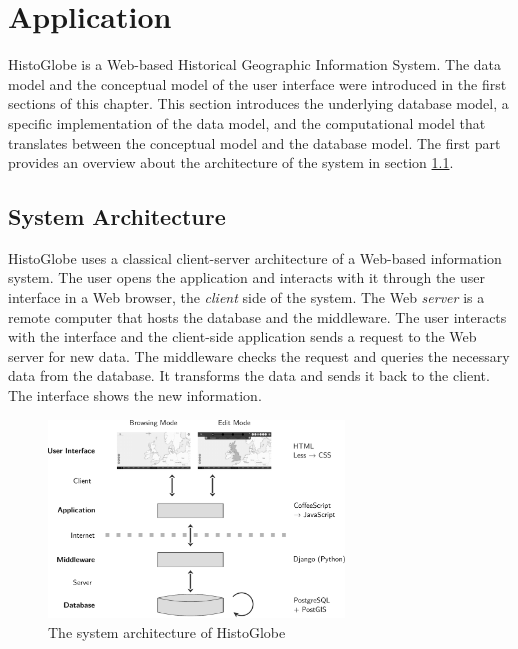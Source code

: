 
\section{Application} %
\label{sec:application}

HistoGlobe is a Web-based Historical Geographic Information System. The data model and the conceptual model of the user interface were introduced in the first sections of this chapter. This section introduces the underlying database model, a specific implementation of the data model, and the computational model that translates between the conceptual model and the database model. The first part provides an overview about the architecture of the system in section \ref{sub:system_architecture}.

\subsection{System Architecture} %
\label{sub:system_architecture}

HistoGlobe uses a classical client-server architecture of a Web-based information system. The user opens the application and interacts with it through the user interface in a Web browser, the \emph{client} side of the system. The Web \emph{server} is a remote computer that hosts the database and the middleware. The user interacts with the interface and the client-side application sends a request to the Web server for new data. The middleware checks the request and queries the necessary data from the database. It transforms the data and sends it back to the client. The interface shows the new information.

\begin{figure}[H]
  \vspace{1em}
  \centering
  \includegraphics[width=0.7\textwidth]{graphics/development/application/system_architecture}
  \caption{The system architecture of HistoGlobe}
  \label{fig:system_architecture}
\end{figure}

